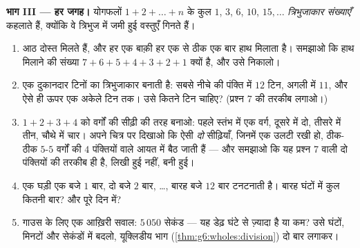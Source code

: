 \begin{problem}
\medskip
\noindent\textbf{भाग III ---  हर जगह।}
योगफलों $1 + 2 + \dots + n$ के कुल $1$, $3$, $6$, $10$, $15, \dots$
\emph{त्रिभुजाकार संख्याएँ} कहलाते
हैं, क्योंकि वे त्रिभुज में जमी हुई वस्तुएँ गिनते हैं।
\begin{enumerate}[resume]
  \item आठ दोस्त मिलते हैं, और हर एक बाक़ी हर एक से ठीक एक बार
        हाथ मिलाता है। समझाओ कि हाथ मिलाने की संख्या
        $7 + 6 + 5 + 4 + 3 + 2 + 1$ क्यों है, और उसे निकालो।
  \item एक दुकानदार टिनों का त्रिभुजाकार  बनाती है: सबसे
        नीचे की पंक्ति में $12$ टिन, अगली में $11$, और ऐसे ही
        ऊपर एक अकेले टिन तक। उसे कितने टिन चाहिए? (प्रश्न 7 की
        तरकीब लगाओ।)
  \item {} $1 + 2 + 3 + 4$ को वर्गों की सीढ़ी की तरह बनाओ:
        पहले स्तंभ में एक वर्ग, दूसरे में दो, तीसरे में तीन,
        चौथे में चार। अपने चित्र पर दिखाओ कि ऐसी \emph{दो}
        सीढ़ियाँ, जिनमें एक उलटी रखी हो, ठीक-ठीक $5$-$5$ वर्गों
        की $4$ पंक्तियों वाले आयत में बैठ जाती हैं --- और समझाओ
        कि यह प्रश्न 7 वाली दो पंक्तियों की तरकीब ही है, लिखी
        हुई नहीं, बनी हुई।
  \item एक घड़ी एक बजे $1$ बार, दो बजे $2$ बार, \dots, बारह बजे
        $12$ बार टनटनाती है। बारह घंटों में कुल कितनी बार? और
        पूरे दिन में?
  \item गाउस के लिए एक आख़िरी सवाल: $5\,050$ सेकंड --- यह डेढ़
        घंटे से ज़्यादा है या कम? उसे घंटों, मिनटों और सेकंडों
        में बदलो, यूक्लिडीय भाग (\cref{thm:g6:wholes:division})
        दो बार लगाकर।
\end{enumerate}
\end{problem}
